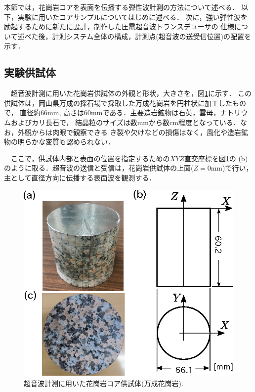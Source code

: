 ﻿本節では，花崗岩コアを表面を伝播する弾性波計測の方法について述べる．
以下，実験に用いたコアサンプルについてはじめに述べる．
次に，強い弾性波を励起するために新たに設計，制作した圧電超音波トランスデューサの
仕様について述べた後，計測システム全体の構成，計測点(超音波の送受信位置)の配置を示す．
\subsection{実験供試体}
　超音波計測に用いた花崗岩供試体の外観と形状，大きさを，図\ref{fig:fig1}に示す．
この供試体は，岡山県万成の採石場で採取した万成花崗岩を円柱状に加工したもので，
直径約66mm, 高さは60mmである．主要造岩鉱物は石英，雲母，ナトリウムおよびカリ長石で，
結晶粒のサイズは数mmから数cm程度となっている．なお，外観からは肉眼で観察できる
き裂や欠けなどの損傷はなく，風化や造岩鉱物の明らかな変質も認められない．

　ここで，供試体内部と表面の位置を指定するための$XYZ$直交座標を図\ref{fig:fig1}の
(b)のように取る．超音波の送信と受信は，花崗岩供試体の上面($Z=0$mm)で行い，
主として直径方向に伝播する表面波を観測する．
\begin{figure}[h]
	\begin{center}
	\includegraphics[width=0.6\linewidth]{Figs/fig1.eps} 
	\end{center}
	\caption{
		超音波計測に用いた花崗岩コア供試体(万成花崗岩).
	} 
	\label{fig:fig1}
\end{figure}
